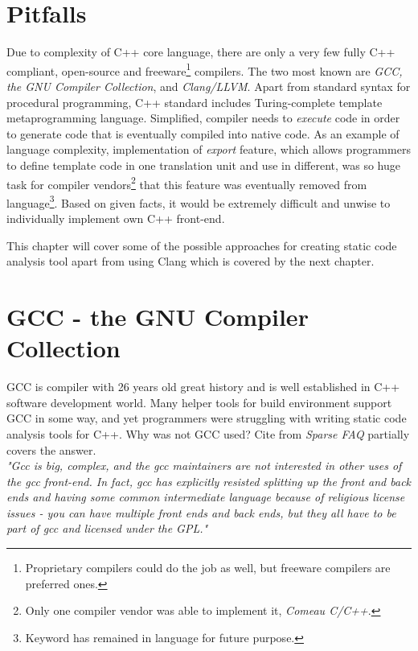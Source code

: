 \section{Pitfalls}
Due to complexity of C++ core language, there are only a very few fully C++ compliant, open-source and freeware\footnote{Proprietary compilers could do the job as well, but freeware compilers are preferred ones.} compilers. The two most known are \emph{GCC, the GNU Compiler Collection}, and \emph{Clang/LLVM}. Apart from standard syntax for procedural programming, C++ standard includes Turing-complete template metaprogramming language. Simplified, compiler needs to \textit{execute} code in order to generate code that is eventually compiled into native code. As an example of language complexity, implementation of \emph{export} feature, which allows programmers to define template code in one translation unit and use in different, was so huge task for compiler vendors\footnote{Only one compiler vendor was able to implement it, \emph{Comeau C/C++}.} that this feature was eventually removed from language\footnote{Keyword has remained in language for future purpose.}. Based on given facts, it would be extremely difficult and unwise to individually implement own C++ front-end.

This chapter will cover some of the possible approaches for creating static code analysis tool apart from using Clang which is covered by the next chapter.

\section{GCC - the GNU Compiler Collection}
GCC is compiler with 26 years old great history and is well established in C++ software development world. Many helper tools for build environment support GCC in some way, and yet programmers were struggling with writing static code analysis tools for C++. Why was not GCC used? Cite from \emph{Sparse FAQ} \cite{sparse} partially covers the answer.\\

\textit{"Gcc is big, complex, and the gcc maintainers are not interested in other uses of the gcc front-end.  In fact, gcc has explicitly resisted splitting up the front and back ends and having some common intermediate language because of religious license issues - you can have multiple front ends and back ends, but they all have to be part of gcc and licensed under the GPL."}\\

